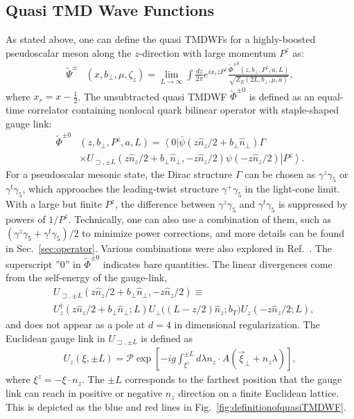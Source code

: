 \documentclass[prd,aps,twocolumn,preprintnumbers, showpacs, nofootinbib,superscriptaddress,notitlepage]{revtex4-1}
\begin{document}


\subsection{Quasi TMD Wave Functions}
As stated above, one can define the quasi TMDWFs for a highly-boosted pseudoscalar meson along the $z$-direction with large momentum $P^z$ as: 
\begin{align}
	\tilde{\Psi}^{\pm}&\left(x,b_{\perp},\mu,\zeta_z\right)=\lim_{L\to\infty}\int\frac{dz}{2\pi}e^{ix_rzP^z}\frac{\tilde{\Phi}^{\pm0}\left(z,b_{\perp},P^z,a,L\right)}{\sqrt{Z_E(2L,b_{\perp},\mu, a)}},\label{eq:quasiWFinmomentumspace}
\end{align}
where $x_r=x-\frac{1}{2}$. The unsubtracted quasi TMDWF $\tilde{\Phi}^{\pm0}$ is defined as an equal-time correlator containing nonlocal quark bilinear operator with staple-shaped gauge link:
\begin{align}
	\tilde{\Phi}^{\pm0}&\left(z,b_{\perp},P^z,a,L\right) =\left\langle 0\right|\bar{\psi}\left(z \hat{n}_{z}/2+b_{\perp} \hat{n}_{\perp}\right) \Gamma \nonumber\\
	&\times U_{\sqsupset, \pm L}\left(z \hat{n}_{z}/2+b_{\perp} \hat{n}_{\perp},-z \hat{n}_{z}/2\right) \psi\left(-z \hat{n}_{z}/2\right)\left| P^{z}\right\rangle. \label{eq:quasiWFincoordinatespace}
\end{align}
For a pseudoscalar mesonic state, the Dirac structure $\Gamma$ can be chosen as $\gamma^z\gamma_5$ or $\gamma^t\gamma_5$, which approaches the leading-twist structure $\gamma^+\gamma_5$ in the light-cone limit. With a large but finite $P^z$, the difference between $\gamma^z\gamma_5$ and $\gamma^t\gamma_5$  is  suppressed by powers of $1/P^z$. Technically, one can also use a combination of them, such as $\left(\gamma^z\gamma_5+\gamma^t\gamma_5\right)/2$ to minimize  power corrections, and more details can be found  in Sec.~\ref{sec:operator}.  Various combinations were also explored in Ref.~\cite{Li:2021wvl}.  The superscript ''0'' in $\tilde{\Phi}^{\pm0}$ indicates bare quantities. The linear divergences come from the self-energy of the gauge-link, 
\begin{align}
	&U_{\sqsupset, \pm L}\left(z \hat{n}_{z}/2+b_{\perp} \hat{n}_{\perp},-z \hat{n}_{z}/2\right) \equiv\nonumber\\
	&	U_z^{\dagger}\left(z \hat{n}_{z}/2+b_{\perp} \hat{n}_{\perp}; L \right) U_{\perp}\big((L-z /2)\hat{n}_{z};{b}_T \big) U_z\left( -z \hat{n}_{z}/2; L \right), \label{eq:stapleshapedUlink}
\end{align}
and does not appear as a pole at $d=4$ in dimensional regularization. The Euclidean gauge link in $U_{\sqsupset, \pm L}$ is defined as
\begin{align}
	U_z(\xi,\pm L)=\mathcal{P}	\exp \left[-i g \int_{\xi^{z}}^{\pm L} d \lambda n_{z} \cdot A\left(\vec{\xi}_{\perp}+n_{z} \lambda\right)\right],
\end{align}
where $\xi^{z}=-\xi \cdot n_{z}$. The $\pm L$  corresponds to the farthest position that the gauge link can reach in positive or negative $n_z$ direction  on a finite Euclidean lattice. This is depicted as the blue and red lines in Fig.~\ref{fig:definitionofquasiTMDWF}.
\end{document}

